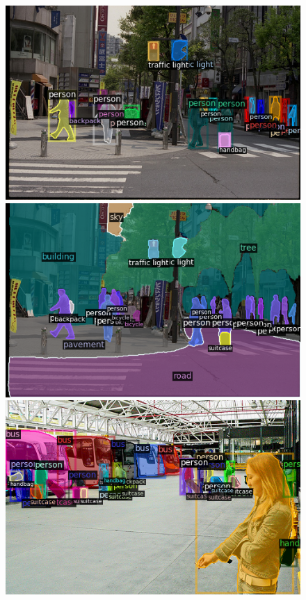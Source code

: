 \begin{figure}[!b]
\centering

\begin{minipage}{1\linewidth}
\centering

\begin{minipage}[b]{.24\linewidth}
\includegraphics[width=\linewidth]{vis/success/val_848_det.png}
\end{minipage}
\begin{minipage}[b]{.24\linewidth}
\includegraphics[width=\linewidth]{vis/success/val_848_pan.png}
\end{minipage}
\begin{minipage}[b]{.24\linewidth}
\includegraphics[width=\linewidth]{vis/success/val_965_det.png}

\end{minipage}
\end{minipage}
\end{figure}
